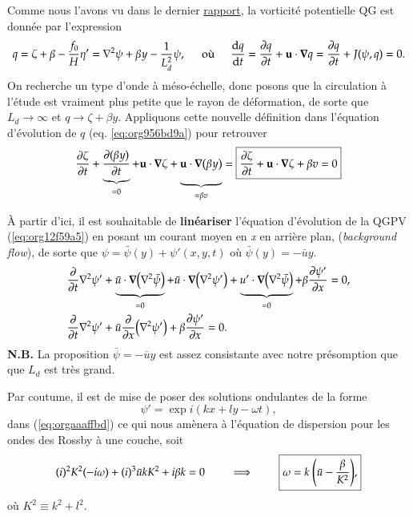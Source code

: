 \documentclass[10pt]{article}
\numberwithin{equation}{section}
\newcommand{\bigno}{\vphantom{\qty(\frac{d}{q})}}
\begin{document}
Comme nous l'avons vu dans le dernier \href{rapport-2023-03-24.org}{rapport}, la vorticité potentielle QG est donnée par l'expression
\begin{equation}
\label{eq:org956bd9a}
q = \zeta + \beta - \frac{f_0}{H} \eta' = \laplacian \psi + \beta y - \frac{1}{L_d^2} \psi,
\hspace{0.5cm}\text{où}\hspace{0.5cm}
\dv{q}{t} = \pdv{q}{t} + \vb{u} \cdot \gradient q = \pdv{q}{t} + J(\psi,q) =  0.
\end{equation}
On recherche un type d'onde à méso-échelle, donc posons que la circulation à l'étude est vraiment plus petite que le rayon de déformation, de sorte que \(L_d \rightarrow \infty\) et \(q \rightarrow \zeta + \beta y\).
Appliquons cette nouvelle définition dans l'équation d'évolution de \(q\) (eq. \ref{eq:org956bd9a}) pour retrouver
\begin{equation}
\label{eq:org12f59a5}
\pdv{\zeta}{t} + \underbrace{\pdv{(\beta y)}{t}}_{=0} + \vb{u}\cdot \gradient \zeta + \underbrace{\vb{u} \cdot \gradient(\beta y)\bigno}_{ =\beta v}
= \boxed{
\pdv{\zeta}{t} + \vb{u}\cdot\gradient\zeta  + \beta v = 0
}
\end{equation}

À partir d'ici, il est souhaitable de \textbf{linéariser} l'équation d'évolution de la QGPV (\ref{eq:org12f59a5}) en posant un courant moyen  en \emph{x} en arrière plan, (\emph{background flow}), de sorte que \(\psi = \bar{\psi}(y) + \psi'(x,y,t)\) où \(\bar{\psi}(y)=-\bar{u}y\).
\begin{align}
\label{eq:orgaaaffbd}
&\pdv{t} \laplacian \psi' + \underbrace{\bar{u}\cdot \gradient (\laplacian \bar{\psi}) }_{=0}
+ \bar{u}\cdot \gradient (\laplacian \psi')
+ \underbrace{u'\cdot \gradient (\laplacian \bar{\psi}) }_{=0}
+ \beta \pdv{\psi'}{x} = 0,\nonumber \\
%
&\pdv{t} \laplacian \psi' + \bar{u}\pdv{x} (\laplacian \psi') + \beta \pdv{\psi'}{x} = 0.
\end{align}
\textbf{N.B.} La proposition \(\bar{\psi} = -\bar{u} y\) est assez consistante avec notre présomption que que \(L_d\) est très grand. \bigskip

Par coutume, il est de mise de poser des solutions ondulantes de la forme
\begin{equation}
\psi' = \exp{i(kx + ly -\omega t)},
\end{equation}
dans (\ref{eq:orgaaaffbd}) ce qui nous amènera à l'équation de dispersion pour les ondes des Rossby à une couche, soit
\begin{equation}
(i)^2 K^2(-i\omega) + (i)^3\bar{u} k K^2 + i \beta k = 0
\hspace{0.8cm}\Longrightarrow\hspace{0.8cm}
\boxed{\omega = k \ \qty(\bar{u} - \frac{\beta}{K^2}),}
\end{equation}
où \(K^2 \equiv k^2 + l^2\).\bigskip
\end{document}
